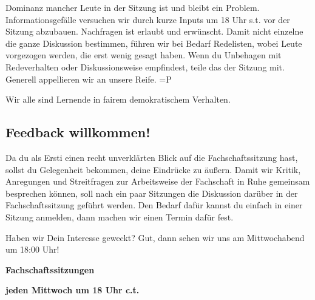 Dominanz mancher Leute in der Sitzung ist und bleibt ein Problem. Informationsgefälle versuchen wir durch kurze Inputs um 18 Uhr \gls{s.t.} vor der Sitzung abzubauen. Nachfragen ist erlaubt und erwünscht. Damit nicht einzelne die ganze Diskussion bestimmen, führen wir bei Bedarf Redelisten, wobei Leute vorgezogen werden, die erst wenig gesagt haben. Wenn du Unbehagen mit Redeverhalten oder Dis\-kussions\-weise empfindest, teile das der Sitzung mit. Generell appellieren wir an unsere Reife. =P

Wir alle sind Lernende in fairem demokratischem Verhalten.

\subsection{Feedback willkommen!}
Da du als Ersti einen recht unverklärten Blick auf die Fachschaftssitzung hast, sollst du Gelegenheit bekommen, deine Eindrücke zu äußern. Damit wir Kritik, Anregungen und Streitfragen zur Arbeitsweise der Fachschaft in Ruhe gemeinsam besprechen können, soll nach ein paar Sitzungen die Diskussion darüber in der Fachschaftssitzung geführt werden. Den Bedarf dafür kannst du einfach in einer Sitzung anmelden, dann machen wir einen Termin dafür fest.

Haben wir Dein Interesse geweckt? Gut, dann sehen wir uns am Mittwochabend um 18:00 Uhr!

\begin{center}
    \large
    \textbf{Fachschaftssitzungen}

    \textbf{jeden Mittwoch um 18 Uhr \gls{c.t.}}
\end{center}
